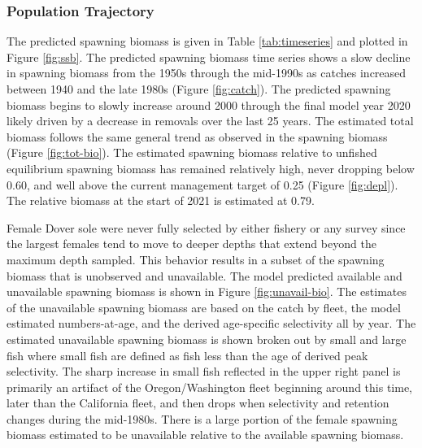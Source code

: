 \documentclass[11pt,
  english,
  a4paper,
]{article}
\begin{document}
\leavevmode\tagmcend\tagstructend\par


\hypertarget{population-trajectory}{%
\subsubsection{Population Trajectory}\label{population-trajectory}}

\leavevmode\tagmcend\tagstructend


The predicted spawning biomass is given in Table \ref{tab:timeseries} and plotted in Figure \ref{fig:ssb}. The predicted spawning biomass time series shows a slow decline in spawning biomass from the 1950s through the mid-1990s as catches increased between 1940 and the late 1980s (Figure \ref{fig:catch}). The predicted spawning biomass begins to slowly increase around 2000 through the final model year 2020 likely driven by a decrease in removals over the last 25 years. The estimated total biomass follows the same general trend as observed in the spawning biomass (Figure \ref{fig:tot-bio}). The estimated spawning biomass relative to unfished equilibrium spawning biomass has remained relatively high, never dropping below 0.60, and well above the current management target of 0.25 (Figure \ref{fig:depl}). The relative biomass at the start of 2021 is estimated at 0.79.

\leavevmode\tagmcend\tagstructend\par


Female Dover sole were never fully selected by either fishery or any survey since the largest females tend to move to deeper depths that extend beyond the maximum depth sampled. This behavior results in a subset of the spawning biomass that is unobserved and unavailable. The model predicted available and unavailable spawning biomass is shown in Figure \ref{fig:unavail-bio}. The estimates of the unavailable spawning biomass are based on the catch by fleet, the model estimated numbers-at-age, and the derived age-specific selectivity all by year. The estimated unavailable spawning biomass is shown broken out by small and large fish where small fish are defined as fish less than the age of derived peak selectivity. The sharp increase in small fish reflected in the upper right panel is primarily an artifact of the Oregon/Washington fleet beginning around this time, later than the California fleet, and then drops when selectivity and retention changes during the mid-1980s. There is a large portion of the female spawning biomass estimated to be unavailable relative to the available spawning biomass.
\end{document}
